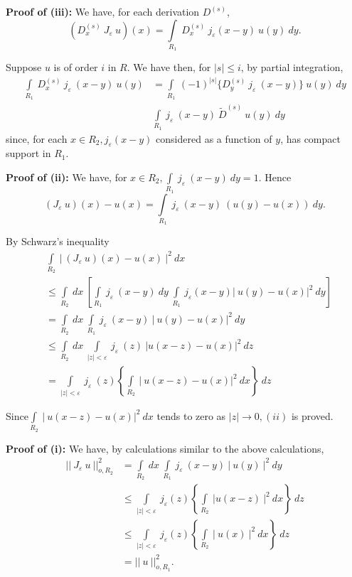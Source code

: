 \noindent \textbf{Proof of (iii):} 
 We have, for each derivation $D^{(s)}$,
 $$
 (D^{(s)}_x ~ J_\varepsilon ~ u) (x) = \int\limits_{R_1} ~ D^{(s)}_x ~
 j_\varepsilon (x - y) ~ u(y) ~ dy. 
 $$

Suppose $u$ is of order $i$ in $R$. We have then, for $| s | \le i$,
by partial integration, 
\begin{align*}
 \int\limits_{R_1} ~ D^{(s)}_x ~ j_\varepsilon ~(x-y) ~ u(y) & =
 \int\limits_{R_1} ~ (-1)^{|s|} \{D^{(s)}_y ~ j_\varepsilon ~(x-y)\}
 ~ u(y) ~ dy\\ 
 & \int\limits_{R_1} ~ j_\varepsilon ~ (x-y) ~ \tilde{D}^{(s)} ~ u(y) ~ dy
\end{align*}
since, for each $x \in R_2, j_\varepsilon (x-y)$ considered as a
function of $y$, has compact support in $R_1$. 

\noindent \textbf{Proof of (ii):} 
 We have, for $x \in R_2, \int\limits_{R_1} ~ j_\varepsilon ~ (x-y) ~
 dy = 1$. Hence 
 $$
 (J_\varepsilon ~ u)(x) -u(x) = \int\limits_{R_1} ~ j_\varepsilon ~
 (x-y) ~ (u(y) - u(x)) ~ dy. 
 $$


By Schwarz's inequality
\begin{align*}
 & \int\limits_{R_2} ~ | ~ (J_\varepsilon ~ u) (x) - u(x) ~ |^2 ~ dx\\
 & \le \int\limits_{R_2} ~ dx ~ \left[ \int\limits_{R_1} ~ j_\varepsilon ~
  (x-y) ~ dy ~ \int\limits_{R_1} ~ j_\varepsilon (x-y) | ~ u(y) -
  u(x) |^2 ~ dy\right]\\ 
 & = \int\limits_{R_2} ~ dx ~ \int\limits_{R_1} ~j_\varepsilon ~(x-y)
 ~ | ~ u(y) - u(x) |^2 ~ dy\\ 
 & \le \int\limits_{R_2} ~ dx ~ \int\limits_{| z | < \varepsilon} ~
 j_{\varepsilon} ~ (z) ~ | u(x-z) - u(x) |^2 ~ dz\\ 
 & = \int\limits_{| z | < \varepsilon} ~ j_\varepsilon ~ (z)
 \left\{\int\limits_{R_2} ~ |~ u(x-z) - u(x) |^2 ~ dx \right\} ~ dz 
\end{align*}

Since\pageoriginale $\int\limits_{R_2} ~ | ~ u (x-z) - u(x) |^2 ~ dx $ tends to zero
as $| z | \rightarrow 0, (ii)$ is proved. 

\noindent \textbf{Proof of (i):} 
 We have, by calculations similar to the above calculations,
 \begin{align*}
  || ~ J_\varepsilon ~ u ~ ||^2_{o,R_2} & = \int\limits_{R_2} ~ dx ~
  \int\limits_{R_1} ~ j_\varepsilon ~ (x-y) ~ | ~ u(y) ~ |^2 ~ dy\\ 
  & \le \int\limits_{|z|< \varepsilon} ~ j_\varepsilon (z) \left\{
  \int\limits_{R_2} ~ | u(x-z) ~ |^2 ~ dx \right\} ~ dz\\ 
  & \le \int\limits_{|z|< \varepsilon} ~ j_\varepsilon (z) \left\{
  \int\limits_{R_2} ~ | ~ u(x) ~ |^2 ~ dx \right\} ~ dz\\ 
  & = || ~ u ~ ||^2_{o,R_1}.
 \end{align*}

